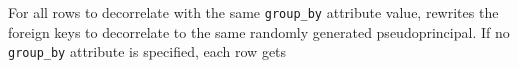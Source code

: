 %
For all rows to decorrelate with the same \texttt{group\_by} attribute value,
\sys rewrites the foreign keys to decorrelate to the same randomly generated
pseudoprincipal.
%
If no \texttt{group\_by} attribute is specified, each row gets 